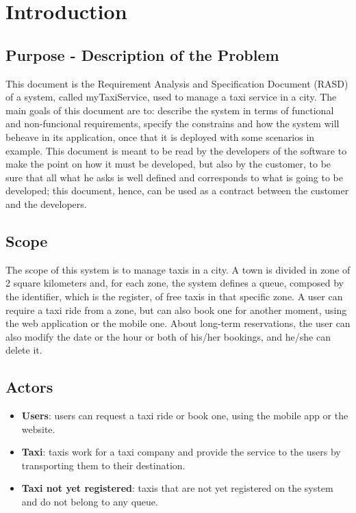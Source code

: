 \section{Introduction}
	\subsection{Purpose - Description of the Problem}
	This document is the Requirement Analysis and Specification Document (RASD) of a system, called myTaxiService, used to manage a taxi service in a city. The main goals of this document are to: describe the system in terms of functional and non-funcional requirements, specify the constrains and how the system will beheave in its application, once that it is deployed with some scenarios in example. This document is meant to be read by the developers of the software to make the point on how it must be developed, but also by the customer, to be sure that all what he asks is well defined and corresponds to what is going to be developed; this document, hence, can be used as a contract between the customer and the developers.
		
	\subsection{Scope}
	The scope of this system is to manage taxis in a city. A town is divided in zone of 2 square kilometers and, for each zone, the system defines a queue, composed by the identifier, which is the register, of free taxis in that specific zone. A user can require a taxi ride from a zone, but can also book one for another moment, using the web application or the mobile one. About long-term reservations, the user can also modify the date or the hour or both of his/her bookings, and he/she can delete it. 
	
	\subsection{Actors}
	\begin{itemize}
		\item \textbf{Users}: users can request a taxi ride or book one, using the mobile app or the website.
		\item \textbf{Taxi}: taxis work for a taxi company and provide the service to the users by transporting them to their destination.
		\item \textbf{Taxi not yet registered}: taxis that are not yet registered on the system and do not belong to any queue.
	\end{itemize}
	
